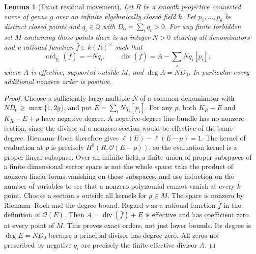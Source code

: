 \documentclass[11pt]{article}
\newtheorem{lemma}[theorem]{Lemma}
\newcommand{\ord}{\operatorname{ord}}
\begin{document}
\begin{lemma}[Exact residual movement]\label{lem:rr}
Let $R$ be a smooth projective connected curve of genus $g$ over an
infinite algebraically closed field $k$. Let $p_1,\ldots,p_d$ be distinct
closed points and $q_i\in\mathbb{Q}$ with $D_0=\sum_i q_i>0$.
For any finite forbidden set $M$ containing those points there is
an integer $N>0$ clearing all denominators and a rational function
$\bar f\in k(R)^\times$ such that
\[
 \ord_{p_i}(\bar f)=-Nq_i,
 \qquad
 \operatorname{div}(\bar f)=A-\sum_i Nq_i[p_i],
\]
where $A$ is effective, supported outside $M$, and $\deg A=ND_0$.
In particular every additional nonzero order is positive.
\end{lemma}
\begin{proof}
Choose a sufficiently large multiple $N$ of a common denominator with
$ND_0\geq\max\{1,2g\}$, and put $E=\sum_iNq_i[p_i]$.
For any $p$, both $K_R-E$ and $K_R-E+p$ have negative degree.
A negative-degree line bundle has no nonzero section, since the
divisor of a nonzero section would be effective of the same degree.
Riemann--Roch therefore gives $\ell(E)-\ell(E-p)=1$.
The kernel of evaluation at $p$ is precisely $H^0(R,\mathcal{O}(E-p))$,
so the evaluation kernel is a proper linear subspace.
Over an infinite field, a finite union of proper subspaces of a finite
dimensional vector space is not the whole space: take the product of
nonzero linear forms vanishing on those subspaces, and use induction
on the number of variables to see that a nonzero polynomial cannot
vanish at every $k$-point. Choose a section $s$ outside all kernels
for $p\in M$. The space is nonzero by Riemann--Roch and the degree
bound. Regard $s$ as a rational function $\bar f$ in the definition
of $\mathcal{O}(E)$. Then $A=\operatorname{div}(\bar f)+E$ is effective
and has coefficient zero at every point of $M$. This proves exact
orders, not just lower bounds. Its degree is $\deg E=ND_0$ because
a principal divisor has degree zero. All zeros not prescribed by
negative $q_i$ are precisely the finite effective divisor $A$.
\end{proof}
\end{document}
